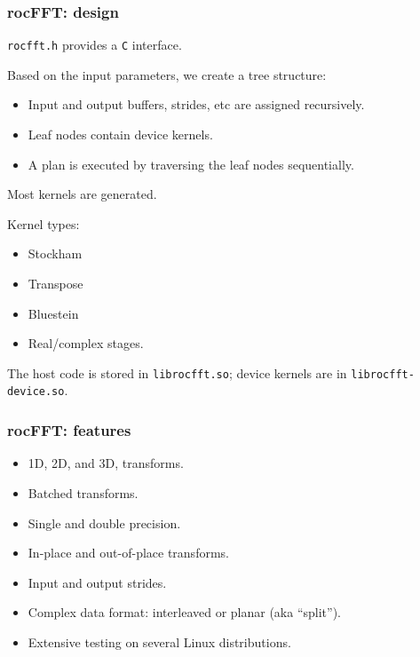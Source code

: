 \documentclass[10pt,aspectratio=169]{beamer}
\begin{document}
\begin{frame}
    \frametitle{rocFFT: design}

    \texttt{rocfft.h} provides a \texttt{C} interface.

    Based on the input parameters, we create a tree structure:
    \begin{itemize}
    \item Input and output buffers, strides, etc are assigned recursively.
    \item Leaf nodes contain device kernels.
    \item A plan is executed by traversing the leaf nodes sequentially.
    \end{itemize}

    \medskip
    
    Most kernels are generated.
    
    \medskip
    
    Kernel types:
    \begin{itemize}
    \item Stockham
    \item Transpose
    \item Bluestein
    \item Real/complex stages.
    \end{itemize}

    The host code is stored in \texttt{librocfft.so}; device kernels are in
    \texttt{librocfft-device.so}.
    
\end{frame}

\begin{frame}
    \frametitle{rocFFT: features}

    \begin{itemize}
    \item 1D, 2D, and 3D, transforms.
      \medskip
    \item Batched transforms.
      \medskip
    \item Single and double precision.
      \medskip
    \item In-place and out-of-place transforms.
      \medskip
    \item Input and output strides.
      \medskip
    \item Complex data format: interleaved or planar (aka ``split'').
      \medskip
    \item Extensive testing on several Linux distributions.
    \end{itemize}

\end{frame}
\end{document}
